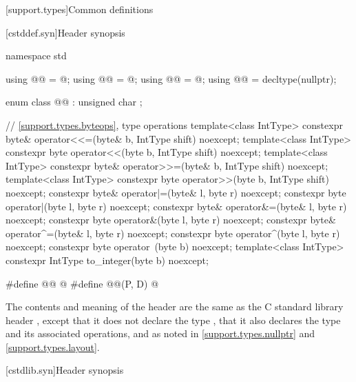 [support.types]{Common definitions}

[cstddef.syn]{Header  synopsis}

%
%
%
%
%
%
%
\begin{codeblock}
namespace std {
  using @@ = @\seebelow@;
  using @@ = @\seebelow@;
  using @@ = @\seebelow@;
  using @@ = decltype(nullptr);

  enum class @@ : unsigned char {};

  // \ref{support.types.byteops},  type operations
  template<class IntType>
    constexpr byte& operator<<=(byte& b, IntType shift) noexcept;
  template<class IntType>
    constexpr byte operator<<(byte b, IntType shift) noexcept;
  template<class IntType>
    constexpr byte& operator>>=(byte& b, IntType shift) noexcept;
  template<class IntType>
    constexpr byte operator>>(byte b, IntType shift) noexcept;
  constexpr byte& operator|=(byte& l, byte r) noexcept;
  constexpr byte operator|(byte l, byte r) noexcept;
  constexpr byte& operator&=(byte& l, byte r) noexcept;
  constexpr byte operator&(byte l, byte r) noexcept;
  constexpr byte& operator^=(byte& l, byte r) noexcept;
  constexpr byte operator^(byte l, byte r) noexcept;
  constexpr byte operator~(byte b) noexcept;
  template<class IntType>
    constexpr IntType to_integer(byte b) noexcept;
}

#define @@ @\seebelow@
#define @@(P, D) @\seebelow@
\end{codeblock}

\pnum
The contents and meaning of the header  are the same as
the C standard library header ,
except that it does not declare the type ,
that it also declares the type 
and its associated operations,
and as noted in
\ref{support.types.nullptr} and
\ref{support.types.layout}.


[cstdlib.syn]{Header  synopsis}

